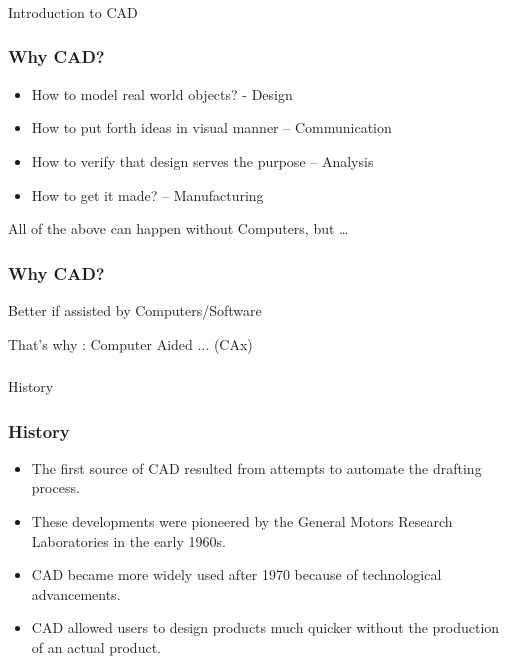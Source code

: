 \begin{frame}[fragile]\frametitle{}
\begin{center}
{\Large Introduction to CAD}
\end{center}
\end{frame}


\begin{frame}[fragile]\frametitle{Why CAD?}
\begin{itemize}
\item How to model real world objects? - Design
\item How to put forth ideas in visual manner – Communication
\item How to verify that design serves the purpose – Analysis
\item How to get it made? – Manufacturing
\end{itemize}

All of the above can happen without Computers, but \ldots 

\end{frame}

\begin{frame}[fragile]\frametitle{Why CAD?}

Better if assisted by Computers/Software

That's why : Computer Aided $\ldots$ (CAx)
\end{frame}

\begin{frame}[fragile]\frametitle{}
\begin{center}
{\Large History}
\end{center}
\end{frame}

\begin{frame}[fragile]\frametitle{History}
\begin{itemize}
\item The first source of CAD resulted from attempts to automate the drafting process.
\item These developments were pioneered by the General Motors Research Laboratories in the early 1960s.
\item CAD became more widely used after 1970 because of technological advancements.
\item CAD allowed users to design products much quicker without the production of an actual product.

\end{itemize}

\end{frame}

